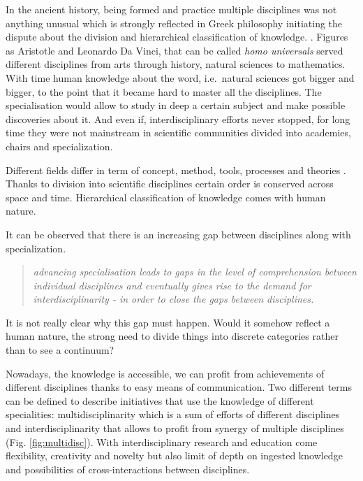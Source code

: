 \documentclass[12pt,]{book}
\theoremstyle{definition}
\theoremstyle{definition}
\theoremstyle{definition}
\theoremstyle{remark}
\begin{document}
In the ancient history, being formed and practice multiple disciplines
was not anything unusual which is strongly reflected in Greek philosophy
initiating the dispute about the division and hierarchical
classification of knowledge. \citep{Slavicek2012}. Figures as Aristotle
and Leonardo Da Vinci, that can be called \emph{homo universals} served
different disciplines from arts through history, natural sciences to
mathematics. With time human knowledge about the word, i.e.~natural
sciences got bigger and bigger, to the point that it became hard to
master all the disciplines. The specialisation would allow to study in
deep a certain subject and make possible discoveries about it. And even
if, interdisciplinary efforts never stopped, for long time they were not
mainstream in scientific communities divided into academies, chairs and
specialization.

Different fields differ in term of concept, method, tools, processes and
theories \citep{Slavicek2012}. Thanks to division into scientific
disciplines certain order is conserved across space and time.
Hierarchical classification of knowledge comes with human nature.

It can be observed that there is an increasing gap between disciplines
along with specialization.

\begin{quote}
\emph{advancing specialisation leads to gaps in the level of
comprehension between individual disciplines and eventually gives rise
to the demand for interdisciplinarity - in order to close the gaps
between disciplines.}\citep{Slavicek2012}
\end{quote}

It is not really clear why this gap must happen. Would it somehow
reflect a human nature, the strong need to divide things into discrete
categories rather than to see a continuum?

Nowadays, the knowledge is accessible, we can profit from achievements
of different disciplines thanks to easy means of communication. Two
different terms can be defined to describe initiatives that use the
knowledge of different specialities: multidisciplinarity which is a sum
of efforts of different disciplines and interdisciplinarity that allows
to profit from synergy of multiple disciplines (Fig.
\ref{fig:multidisc}). With interdisciplinary research and education come
flexibility, creativity and novelty but also limit of depth on ingested
knowledge and possibilities of cross-interactions between disciplines.
\end{document}
